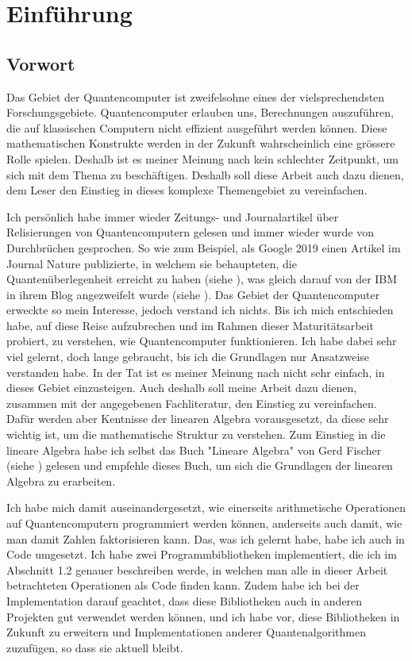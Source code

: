 \chapter{Einführung}
\section{Vorwort}
Das Gebiet der Quantencomputer ist zweifelsohne eines der vielsprechendsten Forschungsgebiete. Quantencomputer erlauben uns, Berechnungen auszuführen, die auf klassischen Computern nicht effizient ausgeführt werden können. Diese mathematischen Konstrukte werden in der Zukunft wahrscheinlich eine grössere Rolle spielen. Deshalb ist es meiner Meinung nach kein schlechter Zeitpunkt, um sich mit dem Thema zu beschäftigen. Deshalb soll diese Arbeit auch dazu dienen, dem Leser den Einstieg in dieses komplexe Themengebiet zu vereinfachen. 

Ich persönlich habe immer wieder Zeitungs- und Journalartikel über Relisierungen von Quantencomputern gelesen und immer wieder wurde von Durchbrüchen gesprochen. So wie zum Beispiel, als Google 2019 einen Artikel im Journal \grqq Nature\grqq{} publizierte, in welchem sie behaupteten, die \grqq Quantenüberlegenheit\grqq{} erreicht zu haben (siehe \cite{GSP}), was gleich darauf von der IBM in ihrem Blog angezweifelt wurde (siehe \cite{IBM}). Das Gebiet der Quantencomputer erweckte so mein Interesse, jedoch verstand ich nichts. Bis ich mich entschieden habe, auf diese \grqq Reise\grqq{} aufzubrechen und im Rahmen dieser Maturitätsarbeit probiert, zu verstehen, wie Quantencomputer funktionieren. Ich habe dabei sehr viel gelernt, doch lange gebraucht, bis ich die Grundlagen nur Ansatzweise verstanden habe. In der Tat ist es meiner Meinung nach nicht sehr einfach, in dieses Gebiet einzusteigen. Auch deshalb soll meine Arbeit dazu dienen, zusammen mit der angegebenen Fachliteratur, den Einstieg zu vereinfachen. Dafür werden aber Kentnisse der linearen Algebra vorausgesetzt, da diese sehr wichtig ist, um die mathematische Struktur zu verstehen. Zum Einstieg in die lineare Algebra habe ich selbst das Buch "Lineare Algebra" von Gerd Fischer (siehe \cite{LA}) gelesen und empfehle dieses Buch, um sich die Grundlagen der linearen Algebra zu erarbeiten.

Ich habe mich damit auseinandergesetzt, wie einerseits arithmetische Operationen auf Quantencomputern programmiert werden können, anderseits auch damit, wie man damit Zahlen faktorisieren kann. Das, was ich gelernt habe, habe ich auch in Code umgesetzt. Ich habe zwei Programmbibliotheken implementiert, die ich im Abschnitt 1.2 genauer beschreiben werde, in welchen man alle in dieser Arbeit betrachteten Operationen als Code finden kann. Zudem habe ich bei der Implementation darauf geachtet, dass diese Bibliotheken auch in anderen Projekten gut verwendet werden können, und ich habe vor, diese Bibliotheken in Zukunft zu erweitern und Implementationen anderer Quantenalgorithmen zuzufügen, so dass sie aktuell bleibt.

